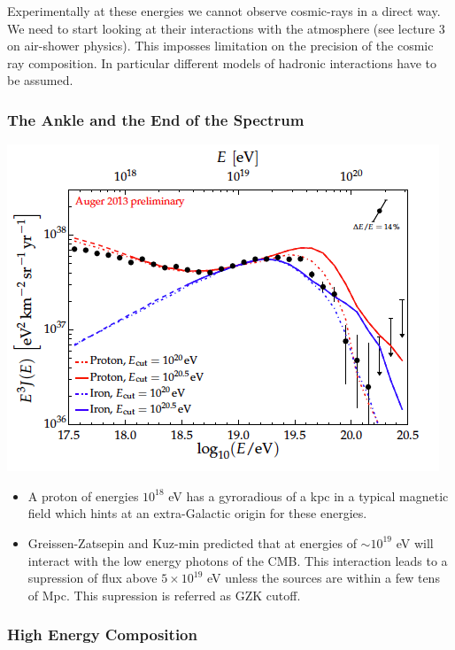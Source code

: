 \documentclass[
  letterpaper,
  DIV=11,
  numbers=noendperiod]{scrreprt}
\begin{document}
Experimentally at these energies we cannot observe cosmic-rays in a
direct way. We need to start looking at their interactions with the
atmosphere (see lecture 3 on air-shower physics). This imposses
limitation on the precision of the cosmic ray composition. In particular
different models of hadronic interactions have to be assumed.

\subsubsection*{The Ankle and the End of the
Spectrum}\label{the-ankle-and-the-end-of-the-spectrum}

\includegraphics{images/ankle.png}

\begin{itemize}
\item
  A proton of energies \(10^{18}\) eV has a gyroradious of a kpc in a
  typical magnetic field which hints at an extra-Galactic origin for
  these energies.
\item
  Greissen-Zatsepin and Kuz-min predicted that at energies of
  \(\sim 10^{19}\) eV will interact with the low energy photons of the
  CMB. This interaction leads to a supression of flux above
  \(5\times10^{19}\) eV unless the sources are within a few tens of Mpc.
  This supression is referred as GZK cutoff.
\end{itemize}

\subsubsection*{High Energy Composition}\label{high-energy-composition}
\end{document}
